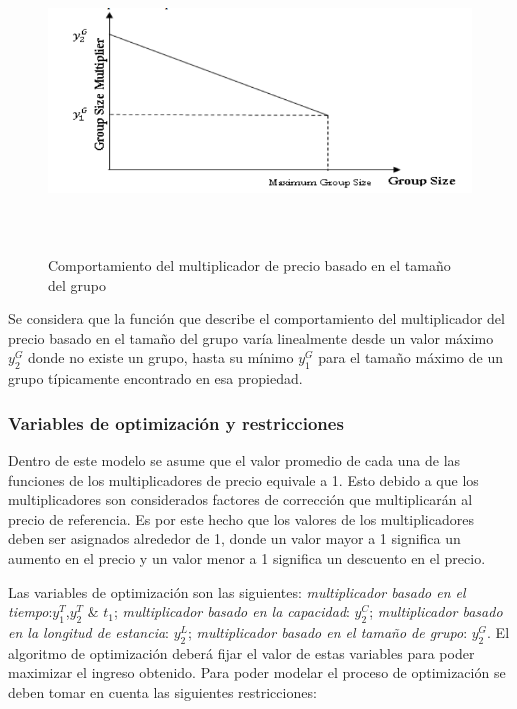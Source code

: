{{{\begin{figure}[H]
  \centering
      \includegraphics[width=\maxwidth,height=8cm]{figures/Group_Mult.png} 
  \caption{Comportamiento del multiplicador de precio basado en el tamaño del grupo}
\end{figure}

Se considera que la función que describe el comportamiento del multiplicador del precio basado en el tamaño del grupo varía linealmente desde un valor máximo $y_2^G$ donde no existe un grupo, hasta su mínimo $y_1^G$ para el tamaño máximo de un grupo típicamente encontrado en esa propiedad.

\subsubsection*{Variables de optimización y restricciones}

Dentro de este modelo se asume que el valor promedio de cada una de las funciones de los multiplicadores de precio equivale a 1. Esto debido a que los multiplicadores son considerados factores de corrección que multiplicarán al precio de referencia. Es por este hecho que los valores de los multiplicadores deben ser asignados alrededor de 1, donde un valor mayor a 1 significa un aumento en el precio y un valor menor a 1 significa un descuento en el precio.

Las variables de optimización son las siguientes: \emph{multiplicador basado en el tiempo}:$y_1^T$,$y_2^T$ \& $t_1$; \emph{multiplicador basado en la capacidad}: $y_2^C$; \emph{multiplicador basado en la longitud de estancia}: $y_2^L$; \emph{multiplicador basado en el tamaño de grupo}: $y_2^G$. El algoritmo de optimización deberá fijar el valor de estas variables para poder maximizar el ingreso obtenido.
Para poder modelar el proceso de optimización se deben tomar en cuenta las siguientes restricciones:

}}}
